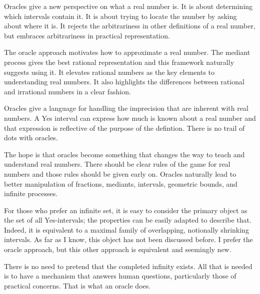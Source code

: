 \documentclass[12pt]{article}
\theoremstyle{remark}
\begin{document}
Oracles give a new perspective on what a real number is. It is about determining which intervals contain it. It is about trying to locate the number by asking about where it is. It rejects the arbitrariness in other definitions of a real number, but embraces arbitrariness in practical representation.

The oracle approach motivates how to approximate a real number. The mediant process gives the best rational representation and this framework naturally suggests using it. It elevates rational numbers as the key elements to understanding real numbers. It also highlights the differences between rational and irrational numbers in a clear fashion. 

Oracles give a language for handling the imprecision that are inherent with real numbers. A Yes interval can express how much is known about a real number and that expression is reflective of the purpose of the defintion. There is no  trail of dots with oracles. 

The hope is that oracles become something that changes the way to teach and understand real numbers. There should be clear rules of the game for real numbers and those rules should be given early on. Oracles naturally lead to better manipulation of fractions, mediants, intervals, geometric bounds, and infinite processes. 

For those who prefer an infinite set, it is easy to consider the primary object as the set of all Yes-intervals; the properties can be easily adapted to describe that. Indeed, it is equivalent to a maximal family of overlapping, notionally shrinking intervals. As far as I know, this object has not been discussed before. I prefer the oracle approach, but this other approach is equivalent and seemingly new. 

There is no need to pretend that the completed infinity exists. All that is needed is to have a mechanism that answers human questions, particularly those of practical concerns. That is what an oracle does. 

\medskip

\printbibliography
\end{document}
